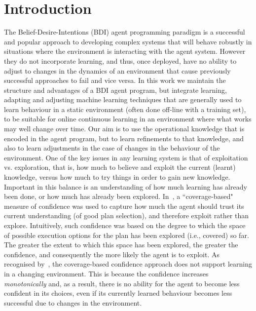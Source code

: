 \section{Introduction}\label{sec:introduction}


The Belief-Desire-Intentions (BDI) agent programming paradigm
\cite{WooldridgeBook,BusettaRHL:AL99-JACK,Pokahr:EXP03-JADEX,jasonbook} is a
successful and popular approach to developing complex systems that
will behave robustly in situations where the environment is
interacting with the agent system.
However they do not incorporate learning, and thus, once deployed,
have no ability to adjust to changes in the dynamics of an environment
that cause previously successful approaches to fail and vice versa.
In this work we maintain the structure and advantages of a BDI agent
program, but integrate learning, adapting and adjusting machine
learning techniques that are generally used to learn behaviour in a
static environment (often done off-line with a training set), to be
suitable for online continuous learning in an environment where what
works may well change over time.
Our aim is to use the operational knowledge that is encoded in the
agent program, but to learn refinements to that knowledge, and also to
learn adjustments in the case of changes in the behaviour of the
environment. 
One of the key issues in any learning system is that of exploitation
vs. exploration, that is, how much to believe and exploit the current
(learnt) knowledge, versus how much to try things in order to gain new
knowledge. Important in this balance is an understanding of how much
learning has already been done, or how much has already been
explored. In~\cite{singh10:extending,singh10:learning}, a
``coverage-based" measure of confidence was used to capture how much
the agent should trust its current understanding (of good plan
selection), and therefore exploit rather than explore. Intuitively,
such confidence was based on the degree to which the space of possible
execution options for the plan has been explored (i.e., covered) so
far. The greater the extent to which this space has been explored, the
greater the confidence, and consequently the more likely the agent is
to exploit.   
%
As recognised by~\cite{singh10:learning}, the coverage-based
confidence approach does not support learning in a changing
environment. This is because the confidence increases
\emph{monotonically} and, as a result, there is no ability for the
agent to become less confident in its choices, even if its currently
learned behaviour becomes less successful due to changes in the
environment. 


